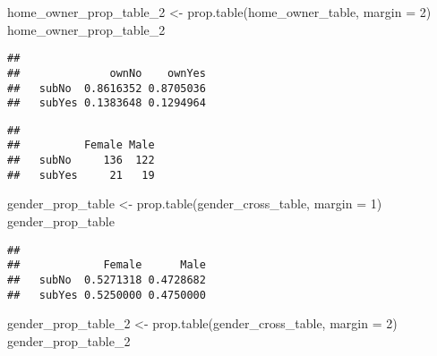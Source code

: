 \documentclass[
]{article}
\newenvironment{Shaded}{\begin{snugshade}}{\end{snugshade}}
\newcommand{\AttributeTok}[1]{\textcolor[rgb]{0.77,0.63,0.00}{#1}}
\newcommand{\CommentTok}[1]{\textcolor[rgb]{0.56,0.35,0.01}{\textit{#1}}}
\newcommand{\DecValTok}[1]{\textcolor[rgb]{0.00,0.00,0.81}{#1}}
\newcommand{\FunctionTok}[1]{\textcolor[rgb]{0.00,0.00,0.00}{#1}}
\newcommand{\NormalTok}[1]{#1}
\newcommand{\OtherTok}[1]{\textcolor[rgb]{0.56,0.35,0.01}{#1}}
\newcommand{\SpecialCharTok}[1]{\textcolor[rgb]{0.00,0.00,0.00}{#1}}
\begin{document}
\begin{Shaded}
\begin{Highlighting}[]
\NormalTok{home\_owner\_prop\_table\_2 }\OtherTok{\textless{}{-}} \FunctionTok{prop.table}\NormalTok{(home\_owner\_table, }\AttributeTok{margin =} \DecValTok{2}\NormalTok{)}
\NormalTok{home\_owner\_prop\_table\_2 }
\end{Highlighting}
\end{Shaded}

\begin{verbatim}
##         
##              ownNo    ownYes
##   subNo  0.8616352 0.8705036
##   subYes 0.1383648 0.1294964
\end{verbatim}

\begin{Shaded}
\end{Shaded}

\begin{verbatim}
##         
##          Female Male
##   subNo     136  122
##   subYes     21   19
\end{verbatim}

\begin{Shaded}
\begin{Highlighting}[]
\NormalTok{gender\_prop\_table }\OtherTok{\textless{}{-}} \FunctionTok{prop.table}\NormalTok{(gender\_cross\_table, }\AttributeTok{margin =} \DecValTok{1}\NormalTok{)}
\NormalTok{gender\_prop\_table}
\end{Highlighting}
\end{Shaded}

\begin{verbatim}
##         
##             Female      Male
##   subNo  0.5271318 0.4728682
##   subYes 0.5250000 0.4750000
\end{verbatim}

\begin{Shaded}
\begin{Highlighting}[]
\NormalTok{gender\_prop\_table\_2 }\OtherTok{\textless{}{-}} \FunctionTok{prop.table}\NormalTok{(gender\_cross\_table, }\AttributeTok{margin =} \DecValTok{2}\NormalTok{)}
\NormalTok{gender\_prop\_table\_2}
\end{Highlighting}
\end{Shaded}
\end{document}
